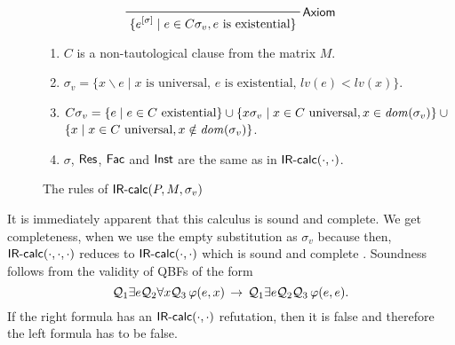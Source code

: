 \documentclass{llncs}
\newcommand{\IRcalcPM}[2]{$\mbox{\sf IR-calc}(#1,#2)$}
\newcommand{\IRcalcPMSubst}[3]{$\mbox{\sf IR-calc}(#1,#2,#3)$}
\newcommand{\Res}{$\mbox{\sf Res}$}
\newcommand{\Fac}{$\mbox{\sf Fac}$}
\newcommand{\Axiom}{$\mbox{\sf Axiom}$}
\newcommand{\Inst}{$\mbox{\sf Inst}$}
\newcommand{\dom}[1]{\ensuremath\mathit{dom}(#1)}
\newcommand{\is}{\ensuremath{\backslash}}
\newcommand{\restrict}[1]{\ensuremath{[#1]}}
\newcommand{\caQ}{{\cal Q}}
\newcommand{\impl}{\rightarrow}
\newcommand{\level}[1]{{\mathit lv(#1)}}
\begin{document}
\begin{figure}[tb]
\begin{mdframed}
\begin{displaymath}
\prfbyaxiom{\Axiom}{\{e^{\restrict{\sigma}} \mid e \in C\sigma_v,
\text{$e$ is existential}\}}
\end{displaymath}

\begin{enumerate}
\item $C$ is a non-tautological clause from the matrix $M$.
\item $\sigma_v = \{x \is e \mid \text{$x$ is universal, 
 $e$ is existential, $\level{e}<\level{x}$}\}$.
\item $C\sigma_v = \{e \mid \text{$e\in C$ existential}\} \cup 
\{x\sigma_v \mid \text{$x\in C$ universal}, x\in \dom{\sigma_v}\} 
\cup \mbox{}$ \\
\hspace*{4em}$\{x \mid \text{$x\in C$ universal}, x\notin \dom{\sigma_v}\}$.
\item $\sigma$, \Res, \Fac{} and \Inst{} are the same as 
in \IRcalcPM{\cdot}{\cdot}.
\end{enumerate}
\end{mdframed}
\caption{The rules of  \IRcalcPMSubst{P}{M}{\sigma_v}
\label{fig:IR-CalcPM-enhanced}}
\end{figure}
It is immediately apparent that 
this calculus is sound and complete. We get completeness, when we use
the empty substitution as $\sigma_v$ because then,
\IRcalcPMSubst{\cdot}{\cdot}{\cdot} reduces to \IRcalcPM{\cdot}{\cdot}
which is sound and complete \cite{DBLP:conf/mfcs/BeyersdorffCJ14}.
Soundness follows from the validity of QBFs of the form
\begin{displaymath}
\caQ_1\exists e \caQ_2 \forall x \caQ_3 \, \varphi(e,x) \, \impl \, 
\caQ_1\exists e \caQ_2 \caQ_3 \, \varphi(e,e).
\end{displaymath}
If the right formula has an \IRcalcPM{\cdot}{\cdot} refutation, then
it is false and therefore the left formula has to be false.
\end{document}
